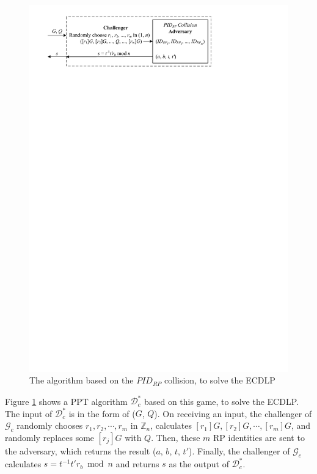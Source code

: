 \begin{figure}[tb]
  \centering
  \includegraphics[width=0.96\linewidth]{fig/ecdlp_algorithm.pdf}
  \caption{The algorithm based on the $PID_{RP}$ collision, to solve the ECDLP}
  \label{fig:ecdlp_algorithm}
\end{figure}


Figure \ref{fig:ecdlp_algorithm} shows a PPT algorithm $\mathcal{D}^*_c$ based on this game, to solve the ECDLP.
The input of $\mathcal{D}^*_c$ is in the form of ($G$, $Q$).
On receiving an input, the challenger of $\mathcal{G}_c$ randomly chooses $r_1, r_2, \cdots, r_m$ in $\mathbb{Z}_n$,
 calculates $[r_1]G, [r_2]G, \cdots, [r_m]G$,
 and randomly replaces some $[r_j]G$ with $Q$.
Then,
    these $m$ RP identities are sent to the adversary,
which returns the result ($a$, $b$, $t$, $t'$).
Finally, the challenger of $\mathcal{G}_c$ calculates $s = t^{-1}t'r_b \bmod n$ and returns $s$ as the output of $\mathcal{D}^*_c$.

